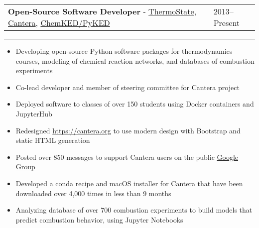 \documentclass[11pt]{article}
\newenvironment{cvevent}[3]{%
%
\begin{tabular*}{1\textwidth}{p{13.9cm} x{3.04cm}}%
    \textbf{#2} - \textcolor{bgcol}{#3} & \vspace{2.5pt}\textcolor{sectcol}{#1}%
\end{tabular*}%

\vspace{-8pt}%
\textcolor{softcol}{\hrule}%
\vspace{6pt}%
}{
\vspace{6pt}
}
\begin{document}
\begin{cvevent}{2013--Present}
{Open-Source Software Developer}
{\href{https://github.com/bryanwweber/thermostate}{ThermoState},
\href{https://github.com/cantera}{Cantera},
\href{https://github.com/pr-omethe-us/pyked}{ChemKED/PyKED}}
\begin{itemize}
    \item Developing open-source Python software packages for thermodynamics courses,
    modeling of chemical reaction networks, and databases of combustion experiments
    \item Co-lead developer and member of steering committee for Cantera project
    \item Deployed software to classes of over 150 students using Docker containers and
    JupyterHub
    \item Redesigned \url{https://cantera.org} to use modern design with Bootstrap and
    static HTML generation
    \item Posted over 850 messages to support Cantera users on the public
    \href{https://groups.google.com/forum/#!forum/cantera-users}{Google Group}
    \item Developed a conda recipe and macOS installer for Cantera that have been
    downloaded over 4,000 times in less than 9 months
    \item Analyzing database of over 700 combustion experiments to build models that
    predict combustion behavior, using Jupyter Notebooks
\end{itemize}
\end{cvevent}

\end{document}
